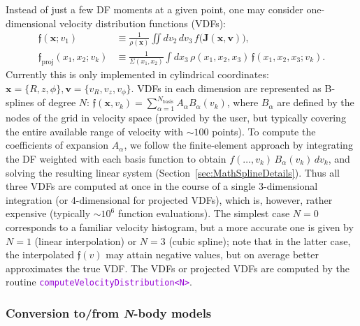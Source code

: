 \documentclass[12pt]{article}
\newcommand{\Nbody}{\textsl{N}-body\xspace}
\newcommand{\ttt}[1]{\textcolor{darkviolet}{\texttt{#1}}}
\newcommand{\bv}{\boldsymbol{v}}
\newcommand{\bx}{\boldsymbol{x}}
\newcommand{\bJ}{\boldsymbol{J}}
\begin{document}
Instead of just a few DF moments at a given point, one may consider one-dimensional velocity distribution functions (VDFs):
\begin{align*}
\mathfrak{f}(\bx;v_1) &\equiv \frac{1}{\rho(\bx)} \iint dv_2\,dv_3\, f\big(\bJ(\bx,\bv)\big) ,\\
\mathfrak{f}_\mathrm{proj}(x_1,x_2;v_k) &\equiv \frac{1}{\Sigma(x_1,x_2)} \int dx_3\, \rho(x_1,x_2,x_3)\,\mathfrak{f}(x_1,x_2,x_3;v_k) .
\end{align*}
Currently this is only implemented in cylindrical coordinates: $\bx=\{R,z,\phi\}, \bv=\{v_R,v_z,v_\phi\}$.
VDFs in each dimension are represented as B-splines of degree $N$: $\mathfrak{f}(\bx, v_k) = \sum_{\alpha=1}^{N_\mathrm{basis}} A_\alpha B_\alpha(v_k)$, where $B_\alpha$ are defined by the nodes of the grid in velocity space (provided by the user, but typically covering the entire available range of velocity with $\sim 100$ points). To compute the coefficients of expansion $A_\alpha$, we follow the finite-element approach by integrating the DF weighted with each basis function to obtain $f(\dots,v_k)\,B_\alpha(v_k)\,dv_k$, and solving the resulting linear system (Section~\ref{sec:MathSplineDetails}). Thus all three VDFs are computed at once in the course of a single 3-dimensional integration (or 4-dimensional for projected VDFs), which is, however, rather expensive (typically $\sim 10^6$ function evaluations). The simplest case $N=0$ corresponds to a familiar velocity histogram, but a more accurate one is given by $N=1$ (linear interpolation) or $N=3$ (cubic spline); note that in the latter case, the interpolated $\mathfrak{f}(v)$ may attain negative values, but on average better approximates the true VDF.
The VDFs or projected VDFs are computed by the routine \ttt{computeVelocityDistribution<N>}.

\subsubsection{Conversion to/from \Nbody models}  \label{sec:Nbody}
\end{document}
